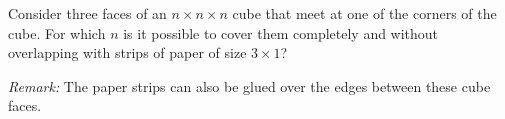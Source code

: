 Consider three faces of an $n\times n \times n$ cube that meet at one of the corners of the cube.
For which $n$ is it possible to cover them completely and without overlapping with strips
of paper of size $3\times 1$?

\emph{Remark:} The paper strips can also be glued over the edges between these cube faces.
